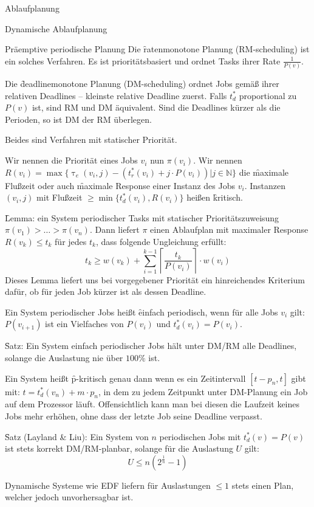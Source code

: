 \begin{chapter}{Ablaufplanung}
\begin{section}{Dynamische Ablaufplanung}
\begin{subsection}{Präemptive periodische Planung}
   Die \f{ratenmonotone Planung (RM-scheduling)} ist ein solches Verfahren. Es ist prioritätsbasiert und ordnet Tasks ihrer Rate $\frac{1}{P(v)}$.
   
   
   Die \f{deadlinemonotone Planung (DM-scheduling)} ordnet Jobs gemäß ihrer relativen Deadlines -- kleinste relative Deadline zuerst. Falls $t_d^*$ proportional zu $P(v)$ ist, sind RM und DM äquivalent. Sind die Deadlines kürzer als die Perioden, so ist DM der RM überlegen.
   
   Beides sind Verfahren mit statischer Priorität.
   
   Wir nennen die Priorität eines Jobs $v_i$ nun $\pi(v_i)$. Wir nennen $R(v_i) = \max \{ \uptau_e(v_i,j)-(t_r^*(v_i)+j\cdot P(v_i)) | j\in\mathbb{N} \}$ die \f{maximale Flußzeit} oder auch \f{maximale Response} einer Instanz des Jobs $v_i$. Instanzen $(v_i,j)$ mit Flußzeit $\geq \min\{ t_d^*(v_i),R(v_i) \}$ heißen \f{kritisch}.
   
   \f{Lemma:} ein System periodischer Tasks mit statischer Prioritätszuweisung $\pi(v_1) > \dots > \pi(v_n)$. Dann liefert $\pi$ einen Ablaufplan mit maximaler Response $R(v_k) \leq t_k$ für jedes $t_k$, dass folgende Ungleichung erfüllt:
   \[ t_k \geq w(v_k) + \sum_{i=1}^{k-1}\left\lceil \frac{t_k}{P(v_i)}\right\rceil \cdot w(v_i) \]
   Dieses Lemma liefert uns bei vorgegebener Priorität ein hinreichendes Kriterium dafür, ob für jeden Job kürzer ist als dessen Deadline. 
   
   Ein System periodischer Jobs heißt \f{einfach periodisch}, wenn für alle Jobs $v_i$ gilt: $P(v_{i+1})$ ist ein Vielfaches von $P(v_i)$ und $t_d^*(v_i) = P(v_i)$.
   
   \f{Satz:} Ein System einfach periodischer Jobs hält unter DM/RM alle Deadlines, solange die Auslastung nie über $100\%$ ist.
   
   Ein System heißt \f{p-kritisch} genau dann wenn es ein Zeitintervall $[t-p_n,t]$ gibt mit: $t=t_d^*(v_n) +m\cdot p_n$, in dem zu jedem Zeitpunkt unter DM-Planung ein Job auf dem Prozessor läuft. Offensichtlich kann man bei diesen die Laufzeit keines Jobs mehr erhöhen, ohne dass der letzte Job seine Deadline verpasst. 
   
   \f{Satz (Layland \& Liu):} Ein System von $n$ periodischen Jobs mit $t_d^*(v) = P(v)$ ist stets korrekt DM/RM-planbar, solange für die Auslastung $U$ gilt:
   \[ U \leq n(2^\frac{1}{n} -1) \]
   
   Dynamische Systeme wie EDF liefern für Auslastungen $\leq 1$ stets einen Plan, welcher jedoch unvorhersagbar ist. 
   

\end{subsection}
\end{section}
\end{chapter}
